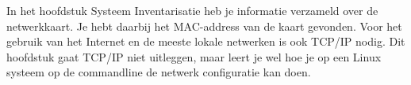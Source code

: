 In het hoofdstuk Systeem Inventarisatie heb je informatie verzameld over de netwerkkaart. Je hebt daarbij het MAC-address van de kaart gevonden. Voor het gebruik van het Internet en de meeste lokale netwerken is ook TCP/IP nodig. Dit hoofdstuk gaat TCP/IP niet uitleggen, maar leert je wel hoe je op een Linux systeem op de commandline de netwerk configuratie kan doen.
